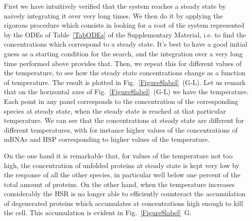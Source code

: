 \documentclass[oneside, 10pt, a4paper, twocolumn]{article}
\begin{document}
First we have intuitively verified that the system reaches a steady state by naively integrating it over very long times. %
We then do it by applying the rigorous procedure which consists in looking for a root of the system 
represented by the ODEs of Table~\ref{TabODEs} of the Supplementary Material, i.e. 
to find the concentrations which correspond to a steady state. 
It's best to have a good initial guess as a starting condition for the search, and the integration over a very long time performed above provides that. 
Then, we repeat this for different values of the temperature, to see how the steady state concentrations change as a function of temperature. The result is plotted in Fig.~\ref{Figure8label}~(G-L). Let us remark that on the horizontal axes of Fig.~\ref{Figure8label}~(G-L) we have the temperature. Each point in any panel corresponds to the concentration of the corresponding species at steady state, when the steady state is reached at that particular temperature. 
We can see that the concentrations at steady state are different for different temperatures, with for instance higher values of the concentrations of mRNAs and HSP corresponding {to higher values of the temperature.} 

{On the one hand it is remarkable that, for values of the temperature not too high, the concentration of unfolded proteins at steady state is kept very low by the response of all the other species, in particular well below one percent of the total amount of proteins.} 
On the other hand, when the temperature increases considerably the HSR is {no longer} able to efficiently counteract the accumulation of degenerated proteins which accumulates at concentrations high enough to kill the cell. This accumulation is evident in Fig.~\ref{Figure8label}~G. 
\end{document}

